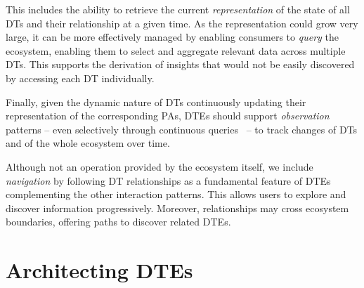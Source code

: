 This includes the ability to retrieve the current \emph{representation} of the state of all \acp{DT} and their relationship at a given time.
%
As the representation could grow very large, it can be more effectively managed by enabling consumers to \emph{query} the ecosystem, enabling them to select and aggregate relevant data across multiple \acp{DT}.
%
This supports the derivation of insights that would not be easily discovered by accessing each \ac{DT} individually.

Finally, given the dynamic nature of \acp{DT} continuously updating their representation of the corresponding \acp{PA}, \acp{DTE} should support \emph{observation} patterns -- even selectively through continuous queries~\cite{babu2001sigmod} -- to track changes of \acp{DT} and of the whole ecosystem over time.

Although not an operation provided by the ecosystem itself, we include \emph{navigation} by following \ac{DT} relationships as a fundamental feature of \acp{DTE} complementing the other interaction patterns.
%
This allows users to explore and discover information progressively.
Moreover, relationships may cross ecosystem boundaries, offering paths to discover related \acp{DTE}.

\section{Architecting \aclp{DTE}}
\label{sec:architecting-dte}


